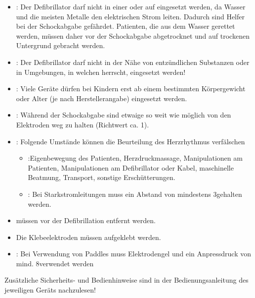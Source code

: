 \bigskip

\begin{BoxRed}[title={\flushleft Sicherheits- und weitere Bedienungshinweise}]
\begin{itemize}
  \item {}: Der Defibrillator darf nicht in einer  oder auf  eingesetzt werden,
  da Wasser und die meisten Metalle den elektrischen Strom
  leiten.
  Dadurch sind Helfer bei der Schockabgabe gefährdet. 
  Patienten, die aus dem Wasser gerettet werden,
  müssen daher vor der Schockabgabe abgetrocknet und auf
  trockenen Untergrund gebracht werden.
  \item {}: Der Defibrillator darf nicht 
  in der Nähe von entzündlichen Substanzen 
  oder in Umgebungen, 
  in welchen  herrscht,
  eingesetzt werden!
  \item {}: 
  Viele Geräte dürfen bei {Kindern}
   erst ab einem 
  bestimmten Körpergewicht oder Alter 
  (je nach Herstellerangabe)
  eingesetzt werden.
  \item {}: 
  Während der Schockabgabe sind etwaige
   so weit wie möglich von den
  Elektroden weg zu halten (Richtwert ca. 1\Meter*).
  \item {}: Folgende Umstände können die Beurteilung des Herzrhythmus verfälschen 
  \begin{itemize}
    \item {}:Eigenbewegung des Patienten,
    Herzdruckmassage,
      Manipulationen am Patienten,
      Manipulationen am Defibrillator oder Kabel, maschinelle
      Beatmung, Transport, sonstige Erschütterungen. 
    \item {}: 
    Bei Starkstromleitungen muss ein Abstand von
    mindestens 3\Meter* gehalten werden.
  \end{itemize}
  \item {} müssen vor der
  Defibrillation entfernt werden.
  \item Die Klebeelektroden müssen 
  aufgeklebt werden.
  \item {}: Bei Verwendung von Paddles muss Elektrodengel und ein Anpressdruck von mind. 8\Kg* verwendet werden
\end{itemize}
Zusätzliche Sicherheits- und Bedienhinweise sind in der
Bedienungsanleitung des jeweiligen Geräts nachzulesen!

\begin{center}
\end{center}

\end{BoxRed}

